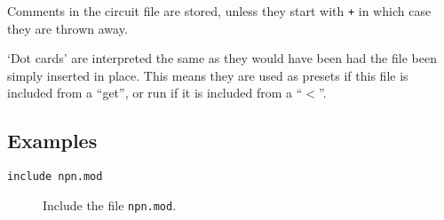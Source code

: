 Comments in the circuit file are stored, unless they start with {\tt *+} in
which case they are thrown away.

`Dot cards' are interpreted the same as they would have been had the
file been simply inserted in place.  This means they are used as
presets if this file is included from a ``get'', or run if it is
included from a ``$<$''.
\subsection{Examples}

\begin{description}

\item[{\tt include npn.mod}] Include the file {\tt npn.mod}.

\end{description}
